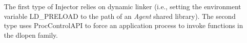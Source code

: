 The first type of Injector relies on dynamic linker (i.e., setting the
environment variable LD\_PRELOAD to the path of an {\em Agent} shared library).
The second type uses ProcControlAPI to force an application process to invoke
functions in the dlopen family.
